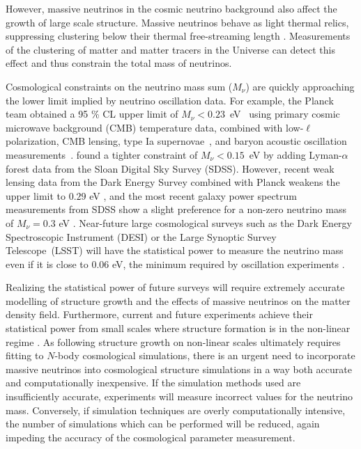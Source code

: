 \documentclass[useAMS, usenatbib]{mnras}
\begin{document}
However, massive neutrinos in the cosmic neutrino background also affect the growth of large scale structure.
Massive neutrinos behave as light thermal relics, suppressing clustering below their thermal
free-streaming length \citep[e.g.][]{Lesgourgues_2006, Wong_2011}.
Measurements of the clustering of matter and matter tracers in the Universe can detect this effect and thus constrain the total mass of neutrinos.

Cosmological constraints on the neutrino mass sum ($M_\nu$) are quickly approaching the lower limit implied by neutrino oscillation data. For example, the Planck team obtained a 95 \% CL upper limit of $M_\nu<0.23$~eV~\citep{planck2015xiii} using primary cosmic microwave background (CMB) temperature data, combined with low-$\ell$ polarization, CMB lensing, type Ia supernovae~\citep{Betoule_2014}, and baryon acoustic oscillation
measurements~\citep{Beutler_2011, Anderson_2014, Ross_2015}. \cite{Palanque_2015} found a tighter constraint of $M_\nu<0.15$~eV by adding Lyman-$\alpha$ forest data from the Sloan Digital Sky Survey (SDSS). However, recent weak lensing data from the Dark Energy Survey combined with Planck weakens the upper limit to $0.29$ eV \citep{DES_2017}, and the most recent galaxy power spectrum measurements from SDSS show a slight preference for a non-zero neutrino mass of $M_\nu = 0.3$ eV \citep{Beutler_2014}.
Near-future large cosmological surveys such as the Dark Energy Spectroscopic Instrument (DESI) \citep{DESI} or the
Large Synoptic Survey Telescope~(LSST) \citep{LSST, Joudaki_2012} will have the statistical power to measure the neutrino mass even if it is close to $0.06$ eV, the minimum required by oscillation experiments \citep{Abazajian_2015}.

Realizing the statistical power of future surveys will require extremely accurate modelling of structure growth and the effects of massive neutrinos on the matter density field.
Furthermore, current and future experiments achieve their statistical power from small scales where structure formation is in the non-linear regime \citep[e.g.~][]{Troxel_2017, HSC_2017}.
As following structure growth on non-linear scales ultimately requires fitting to $N$-body cosmological simulations, there is an urgent need to incorporate massive neutrinos into cosmological structure simulations
in a way both accurate and computationally inexpensive.
If the simulation methods used are insufficiently accurate, experiments will measure incorrect values for the neutrino mass.
Conversely, if simulation techniques are overly computationally intensive, the number of simulations which can be performed will be reduced, again impeding the accuracy of the cosmological parameter measurement.
\end{document}
